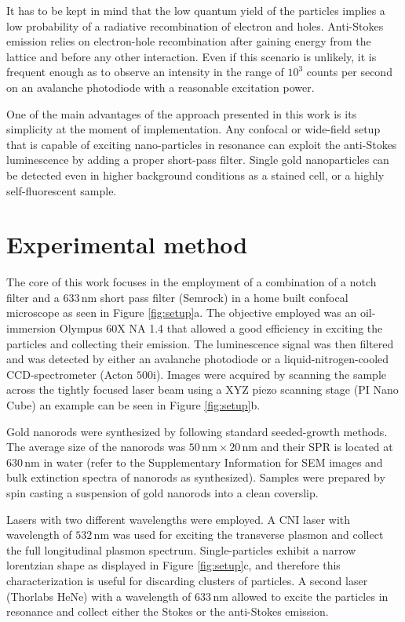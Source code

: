 \documentclass[journal=nalefd,manuscript=letter]{achemso}
\newcommand{\nm}{\ensuremath{\,\textrm{nm}}}
\begin{document}
It has to be kept in mind that the low quantum yield of the particles implies a
low probability of a radiative recombination of electron and holes. Anti-Stokes
emission relies on electron-hole recombination after gaining energy from the
lattice and before any other interaction. Even if this scenario is unlikely,
it is frequent enough as to observe an intensity in the range of $10^3$ counts
per second on an avalanche photodiode with a reasonable excitation power. 

One of the main advantages of the approach presented in this work is its
simplicity at the moment of implementation. Any confocal or wide-field setup
that is capable of exciting nano-particles in resonance can exploit the
anti-Stokes luminescence by adding a proper short-pass filter. Single gold
nanoparticles can be detected even in higher background conditions as a stained
cell, or a highly self-fluorescent sample.

\section{Experimental method}
The core of this work focuses in the employment of a combination of a notch
filter and a  $633\nm$ short pass filter (Semrock) in a home built confocal
microscope as seen in Figure \ref{fig:setup}a. The objective employed was an
oil-immersion Olympus 60X NA 1.4 that allowed a good efficiency in exciting the
particles and collecting their emission. The luminescence signal was then
filtered and was detected by either an avalanche photodiode or a
liquid-nitrogen-cooled CCD-spectrometer (Acton $500\textrm{i}$). Images were
acquired by scanning the sample across the tightly focused laser beam using a
XYZ piezo scanning stage (PI Nano Cube) an example can be seen in Figure
\ref{fig:setup}b.

Gold nanorods were synthesized by following standard seeded-growth
methods\cite{Nikoobakht2003}. The average size of the nanorods was $50\nm\times
20\nm$ and their SPR is located at $630\nm$ in water (refer to the
Supplementary Information for SEM images and bulk extinction spectra of nanorods
as synthesized). Samples were prepared by spin casting a suspension of gold
nanorods into a clean coverslip. 

Lasers with two different wavelengths were employed. A CNI laser with wavelength
of $532\nm$ was used for exciting the transverse plasmon and collect the full
longitudinal plasmon spectrum. Single-particles exhibit a narrow lorentzian
shape as displayed in Figure \ref{fig:setup}c, and therefore this
characterization is useful for discarding clusters of particles. A second laser
(Thorlabs HeNe) with a wavelength of $633\nm$ allowed to excite the particles in
resonance and collect either the Stokes or the anti-Stokes emission.
\end{document}
